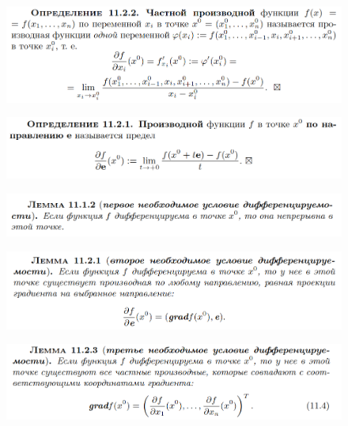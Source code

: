 \documentclass{article}
\begin{document}
\begin{figure}[h!]
    \centering
    \includegraphics[width=\textwidth]{40.png}
    \vspace{-1.5cm}
\end{figure}

\begin{figure}[h!]
    \centering
    \includegraphics[width=\textwidth]{35.png}
    \vspace{-1cm}
\end{figure}

\newpage

\begin{figure}[h!]
    \centering
    \includegraphics[width=\textwidth]{36.png}
    \vspace{-1cm}
\end{figure}

\begin{figure}[h!]
    \centering
    \includegraphics[width=\textwidth]{37.png}
    \vspace{-1cm}
\end{figure}

\begin{figure}[h!]
    \centering
    \includegraphics[width=\textwidth]{38.png}
    \vspace{-1cm}
\end{figure}
\end{document}
